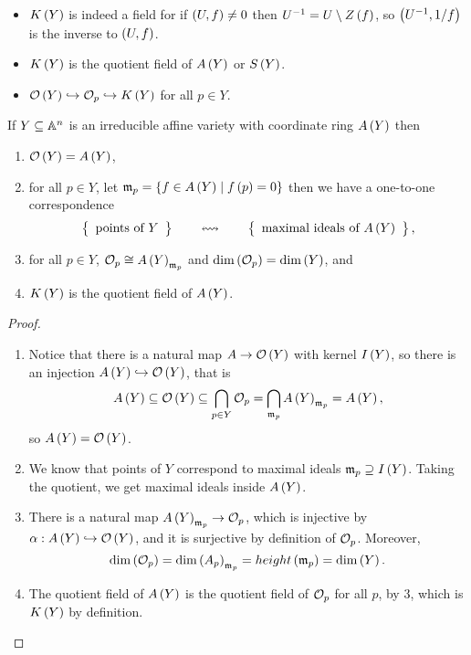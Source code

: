 \begin{remark}
\hfill
\begin{itemize}
\item $ K\left( Y \right) $ is indeed a field for if $ \left( U, f \right) \ne 0 $ then $ U^{-1} = U \setminus Z\left( f \right) $, so $ \left( U^{-1}, 1 / f \right) $ is the inverse to $ \left( U, f \right) $.
\item $ K\left( Y \right) $ is the quotient field of $ A\left( Y \right) $ or $ S\left( Y \right) $.
\item $ \mathcal{O}\left( Y \right) \hookrightarrow \mathcal{O}_p \hookrightarrow K\left( Y \right) $ for all $ p \in Y $.
\end{itemize}
\end{remark}

\begin{theorem}
If $ Y \subseteq \mathbb{A}^n $ is an irreducible affine variety with coordinate ring $ A\left( Y \right) $ then
\begin{enumerate}
\item $ \mathcal{O}\left( Y \right) = A\left( Y \right) $,
\item for all $ p \in Y $, let $ \mathfrak{m}_p = \left\{ f \in A\left( Y \right) \mid f\left( p \right) = 0 \right\} $ then we have a one-to-one correspondence
$$ \correspondence{\text{points of} \ Y}{\text{maximal ideals of} \ A\rb{Y}}, $$
\item for all $ p \in Y $, $ \mathcal{O}_p \cong A\left( Y \right)_{\mathfrak{m}_p} $ and $ \dim\left( \mathcal{O}_p \right) = \dim\left( Y \right) $, and
\item $ K\left( Y \right) $ is the quotient field of $ A\left( Y \right) $.
\end{enumerate}
\end{theorem}

\begin{proof}
\hfill
\begin{enumerate}
\item Notice that there is a natural map $ A \to \mathcal{O}\left( Y \right) $ with kernel $ I\left( Y \right) $, so there is an injection $ A\left( Y \right) \hookrightarrow \mathcal{O}\left( Y \right) $, that is
$$ A\left( Y \right) \subseteq \mathcal{O}\left( Y \right) \subseteq \bigcap_{p \in Y} \mathcal{O}_p = \bigcap_{\mathfrak{m}_p} A\left( Y \right)_{\mathfrak{m}_p} = A\left( Y \right), $$
so $ A\left( Y \right) = \mathcal{O}\left( Y \right) $.
\item We know that points of $ Y $ correspond to maximal ideals $ \mathfrak{m}_p \supseteq I\left( Y \right) $. Taking the quotient, we get maximal ideals inside $ A\left( Y \right) $.
\item There is a natural map $ A\left( Y \right)_{\mathfrak{m}_p} \to \mathcal{O}_p $, which is injective by $ \alpha : A\left( Y \right) \hookrightarrow \mathcal{O}\left( Y \right) $, and it is surjective by definition of $ \mathcal{O}_p $. Moreover,
$$ \dim\left( \mathcal{O}_p \right) = \dim\left( A_p \right)_{\mathfrak{m}_p} = height\left( \mathfrak{m}_p \right) = \dim\left( Y \right). $$
\item The quotient field of $ A\left( Y \right) $ is the quotient field of $ \mathcal{O}_p $ for all $ p $, by $ 3 $, which is $ K\left( Y \right) $ by definition.
\end{enumerate}
\end{proof}

